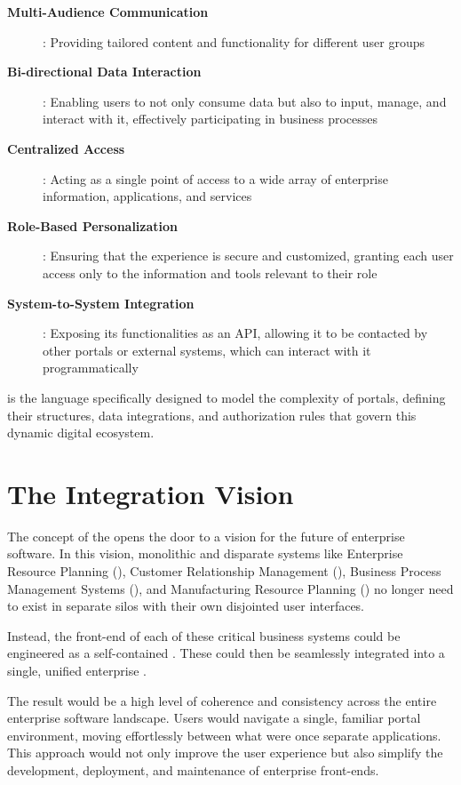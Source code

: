 \begin{description}
\item[\textbf{Multi-Audience Communication}]: Providing tailored content and functionality for different user groups
\item[\textbf{Bi-directional Data Interaction}]: Enabling users to not only consume data but also to input, manage, and interact with it, effectively participating in business processes
\item[\textbf{Centralized Access}]: Acting as a single point of access to a wide array of enterprise information, applications, and services
\item[\textbf{Role-Based Personalization}]: Ensuring that the experience is secure and customized, granting each user access only to the information and tools relevant to their role
\item[\textbf{System-to-System Integration}]: Exposing its functionalities as an API, allowing it to be contacted by other portals or external systems, which can interact with it programmatically
\end{description}

\wbdl{} is the language specifically designed to model the complexity of portals, defining their structures, data integrations, and authorization rules that govern this dynamic digital ecosystem.

\section{The Integration Vision}
\label{sec:integration-vision}

The concept of the \textbf{\webbaselet{}} opens the door to a vision for the future of enterprise software. In this vision, monolithic and disparate systems like Enterprise Resource Planning (\erp{}), Customer Relationship Management (\crm{}), Business Process Management Systems (\bpms{}), and Manufacturing Resource Planning (\mrp{}) no longer need to exist in separate silos with their own disjointed user interfaces.

Instead, the front-end of each of these critical business systems could be engineered as a self-contained \textbf{\webbaselet{}}. These  could then be seamlessly integrated into a single, unified enterprise \textbf{\webbase{}}.

The result would be a high level of coherence and consistency across the entire enterprise software landscape. Users would navigate a single, familiar portal environment, moving effortlessly between what were once separate applications. This approach would not only improve the user experience but also simplify the development, deployment, and maintenance of enterprise front-ends.


